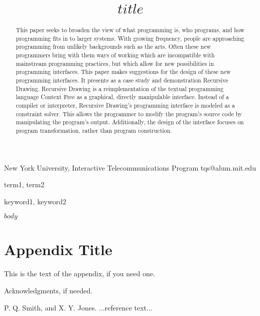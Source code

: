 \documentclass[preprint,10pt]{sigplanconf}
\begin{document}
\copyrightdata{[to be supplied]} 


\title{$title$}

           {New York University, Interactive Telecommunications Program}
           {tqs@alum.mit.edu}

\maketitle

\begin{abstract}
This paper seeks to broaden the view of what programming is, who programs, and how programming fits in to larger systems. With growing frequency, people are approaching programming from unlikely backgrounds such as the arts. Often these new programmers bring with them ways of working which are incompatible with mainstream programming practices, but which allow for new possibilities in programming interfaces. This paper makes suggestions for the design of these new programming interfaces. It presents as a case study and demonstration Recursive Drawing. Recursive Drawing is a reimplementation of the textual programming language Context Free as a graphical, directly manipulable interface. Instead of a compiler or interpreter, Recursive Drawing's programming interface is modeled as a constraint solver. This allows the programmer to modify the program's source code by manipulating the program's output. Additionally, the design of the interface focuses on program transformation, rather than program construction.
\end{abstract}


\terms
term1, term2

\keywords
keyword1, keyword2

$body$

\appendix
\section{Appendix Title}

This is the text of the appendix, if you need one.

\acks

Acknowledgments, if needed.





\begin{thebibliography}{}
\softraggedright

P. Q. Smith, and X. Y. Jones. ...reference text...

\end{thebibliography}
\end{document}
